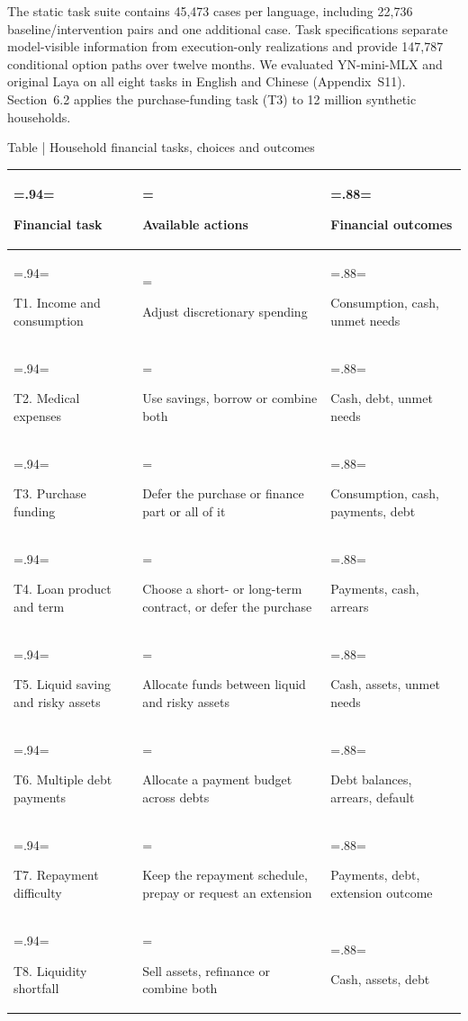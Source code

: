 \documentclass[10pt]{article}
\begin{document}
The static task suite contains 45,473 cases per language, including 22,736 baseline/intervention pairs and one additional case. Task specifications separate model-visible information from execution-only realizations and provide 147,787 conditional option paths over twelve months. We evaluated YN-mini-MLX and original Laya on all eight tasks in English and Chinese (Appendix~S11). Section~6.2 applies the purchase-funding task (T3) to 12 million synthetic households.
\begin{table}[!htbp]
\begin{minipage}{\textwidth}
\fontsize{9}{11}\selectfont
\renewcommand{\arraystretch}{1.10}
\label{table:main1}Table \thetable{} | Household financial tasks, choices and outcomes
\par\vspace{4pt}
\begin{tabularx}{\textwidth}{@{}>{\hsize=.94\hsize\linewidth=\hsize\raggedright\arraybackslash}X>{\hsize=1.18\hsize\linewidth=\hsize\raggedright\arraybackslash}X>{\hsize=.88\hsize\linewidth=\hsize\raggedright\arraybackslash}X@{}}
\toprule
Financial task & Available actions & Financial outcomes \\
\midrule
T1. Income and consumption & Adjust discretionary spending & Consumption, cash, unmet needs \\
T2. Medical expenses & Use savings, borrow or combine both & Cash, debt, unmet needs \\
T3. Purchase funding & Defer the purchase or finance part or all of it & Consumption, cash, payments, debt \\
T4. Loan product and term & Choose a short- or long-term contract, or defer the purchase & Payments, cash, arrears \\
T5. Liquid saving and risky assets & Allocate funds between liquid and risky assets & Cash, assets, unmet needs \\
T6. Multiple debt payments & Allocate a payment budget across debts & Debt balances, arrears, default \\
T7. Repayment difficulty & Keep the repayment schedule, prepay or request an extension & Payments, debt, extension outcome \\
T8. Liquidity shortfall & Sell assets, refinance or combine both & Cash, assets, debt \\
\bottomrule
\end{tabularx}
\par{}
\end{minipage}
\end{table}
\end{document}
